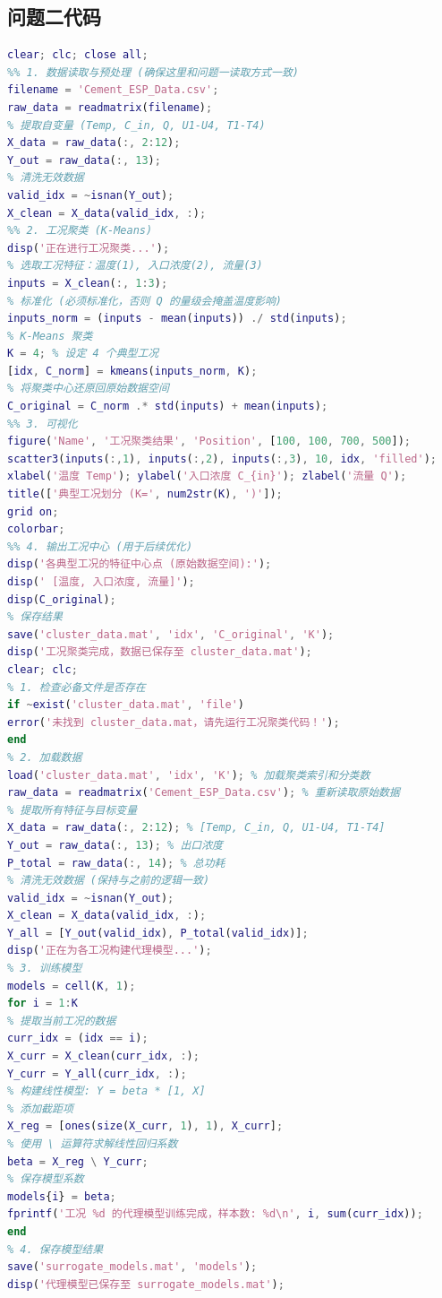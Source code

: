 \documentclass[UTF8, a4paper]{ctexart}
\begin{document}
\subsection{问题二代码}
\begin{lstlisting}[language=Matlab]
    clear; clc; close all;
%% 1. 数据读取与预处理 (确保这里和问题一读取方式一致)
filename = 'Cement_ESP_Data.csv';
raw_data = readmatrix(filename);
% 提取自变量 (Temp, C_in, Q, U1-U4, T1-T4)
X_data = raw_data(:, 2:12); 
Y_out = raw_data(:, 13);
% 清洗无效数据
valid_idx = ~isnan(Y_out);
X_clean = X_data(valid_idx, :);
%% 2. 工况聚类 (K-Means)
disp('正在进行工况聚类...');
% 选取工况特征：温度(1), 入口浓度(2), 流量(3)
inputs = X_clean(:, 1:3); 
% 标准化 (必须标准化，否则 Q 的量级会掩盖温度影响)
inputs_norm = (inputs - mean(inputs)) ./ std(inputs);
% K-Means 聚类
K = 4; % 设定 4 个典型工况
[idx, C_norm] = kmeans(inputs_norm, K);
% 将聚类中心还原回原始数据空间
C_original = C_norm .* std(inputs) + mean(inputs);
%% 3. 可视化
figure('Name', '工况聚类结果', 'Position', [100, 100, 700, 500]);
scatter3(inputs(:,1), inputs(:,2), inputs(:,3), 10, idx, 'filled');
xlabel('温度 Temp'); ylabel('入口浓度 C_{in}'); zlabel('流量 Q');
title(['典型工况划分 (K=', num2str(K), ')']);
grid on;
colorbar;
%% 4. 输出工况中心 (用于后续优化)
disp('各典型工况的特征中心点 (原始数据空间):');
disp(' [温度, 入口浓度, 流量]');
disp(C_original);
% 保存结果
save('cluster_data.mat', 'idx', 'C_original', 'K');
disp('工况聚类完成，数据已保存至 cluster_data.mat');
clear; clc;
% 1. 检查必备文件是否存在
if ~exist('cluster_data.mat', 'file')
error('未找到 cluster_data.mat，请先运行工况聚类代码！');
end
% 2. 加载数据
load('cluster_data.mat', 'idx', 'K'); % 加载聚类索引和分类数
raw_data = readmatrix('Cement_ESP_Data.csv'); % 重新读取原始数据
% 提取所有特征与目标变量
X_data = raw_data(:, 2:12); % [Temp, C_in, Q, U1-U4, T1-T4]
Y_out = raw_data(:, 13); % 出口浓度
P_total = raw_data(:, 14); % 总功耗
% 清洗无效数据 (保持与之前的逻辑一致)
valid_idx = ~isnan(Y_out);
X_clean = X_data(valid_idx, :);
Y_all = [Y_out(valid_idx), P_total(valid_idx)]; 
disp('正在为各工况构建代理模型...');
% 3. 训练模型
models = cell(K, 1); 
for i = 1:K
% 提取当前工况的数据
curr_idx = (idx == i);
X_curr = X_clean(curr_idx, :);
Y_curr = Y_all(curr_idx, :);
% 构建线性模型: Y = beta * [1, X]
% 添加截距项
X_reg = [ones(size(X_curr, 1), 1), X_curr];
% 使用 \ 运算符求解线性回归系数
beta = X_reg \ Y_curr; 
% 保存模型系数
models{i} = beta;
fprintf('工况 %d 的代理模型训练完成，样本数: %d\n', i, sum(curr_idx));
end
% 4. 保存模型结果
save('surrogate_models.mat', 'models');
disp('代理模型已保存至 surrogate_models.mat');

\end{lstlisting}
\end{document}

